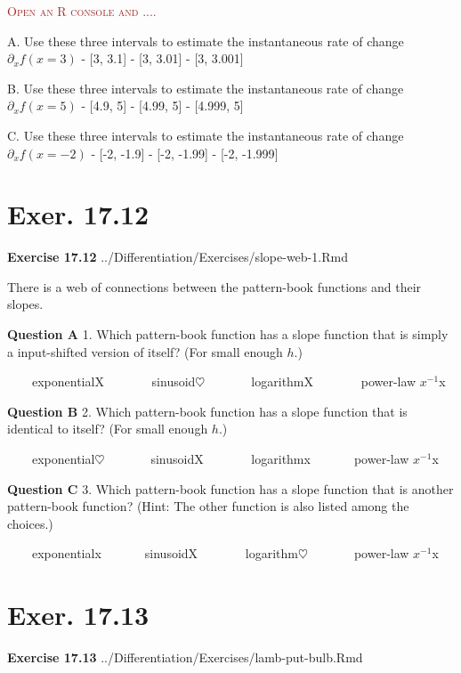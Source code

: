 \documentclass[
  letterpaper,
  DIV=11,
  numbers=noendperiod,
  oneside]{article}
\newenvironment{scaffolding}%
{%
\textcolor{brown}{\hrulefill}%
  \par\vspace{.3\baselineskip}%
  \textcolor{brown}{\scshape Open an R console and ....}%
  \par\vspace{\baselineskip}%
}%
{\textcolor{brown}{\hrulefill}}
\begin{document}
\begin{multicols}{2}
\begin{scaffolding}
\end{scaffolding}

A. Use these three intervals to estimate the instantaneous rate of
change \(\partial_x f(x=3)\) - {[}3, 3.1{]} - {[}3, 3.01{]} - {[}3,
3.001{]}

B. Use these three intervals to estimate the instantaneous rate of
change \(\partial_x f(x=5)\) - {[}4.9, 5{]} - {[}4.99, 5{]} - {[}4.999,
5{]}

C. Use these three intervals to estimate the instantaneous rate of
change \(\partial_x f(x=-2)\) - {[}-2, -1.9{]} - {[}-2, -1.99{]} -
{[}-2, -1.999{]}

\hypertarget{exer.-17.12}{%
\section*{Exer. 17.12}\label{exer.-17.12}}

\textbf{Exercise 17.12} ../Differentiation/Exercises/slope-web-1.Rmd

There is a web of connections between the pattern-book functions and
their slopes.

\textbf{Question A} 1. Which pattern-book function has a slope function
that is simply a input-shifted version of itself? (For small enough
\(h\).)

~~~~{exponential{︎X
}}~~~~~~~{sinusoid{\(\heartsuit\ \)}}~~~~~~~{logarithm{︎X
}}~~~~~~~{power-law \(x^{-1}\){x}}

\textbf{Question B} 2. Which pattern-book function has a slope function
that is identical to itself? (For small enough \(h\).)

~~~~{exponential{\(\heartsuit\ \)}}~~~~~~~{sinusoid{︎X
}}~~~~~~~{logarithm{x}}~~~~~~~{power-law \(x^{-1}\){x}}

\textbf{Question C} 3. Which pattern-book function has a slope function
that is another pattern-book function? (Hint: The other function is also
listed among the choices.)

~~~~{exponential{x}}~~~~~~~{sinusoid{︎X
}}~~~~~~~{logarithm{\(\heartsuit\ \)}}~~~~~~~{power-law \(x^{-1}\){x}}

\hypertarget{exer.-17.13}{%
\section*{Exer. 17.13}\label{exer.-17.13}}

\textbf{Exercise 17.13} ../Differentiation/Exercises/lamb-put-bulb.Rmd


\end{multicols}
\end{document}
